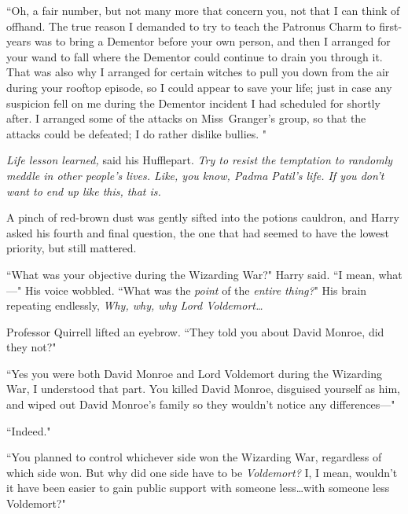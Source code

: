``Oh, a fair number, but not many more that concern you, not that I can think of offhand. The true reason I demanded to try to teach the Patronus Charm to first-years was to bring a Dementor before your own person, and then I arranged for your wand to fall where the Dementor could continue to drain you through it.  That was also why I arranged for certain witches to pull you down from the air during your rooftop episode, so I could appear to save your life; just in case any suspicion fell on me during the Dementor incident I had scheduled for shortly after.  I arranged some of the attacks on Miss~Granger's group, so that the attacks could be defeated; I do rather dislike bullies. "

\emph{Life lesson learned,} said his Hufflepart. \emph{Try to resist the temptation to randomly meddle in other people's lives. Like, you know, Padma Patil's life. If you don't want to end up like this, that is.}

A pinch of red-brown dust was gently sifted into the potions cauldron, and Harry asked his fourth and final question, the one that had seemed to have the lowest priority, but still mattered.

``What was your objective during the Wizarding War?" Harry said. ``I mean, what—" His voice wobbled. ``What was the \emph{point} of the \emph{entire thing?}" His brain repeating endlessly, \emph{Why, why, why Lord Voldemort…}

Professor Quirrell lifted an eyebrow. ``They told you about David Monroe, did they not?"

``Yes you were both David Monroe and Lord Voldemort during the Wizarding War, I understood that part. You killed David Monroe, disguised yourself as him, and wiped out David Monroe's family so they wouldn't notice any differences—"

``Indeed."

``You planned to control whichever side won the Wizarding War, regardless of which side won. But why did one side have to be \emph{Voldemort?} I, I mean, wouldn't it have been easier to gain public support with someone less…with someone less Voldemort?"

